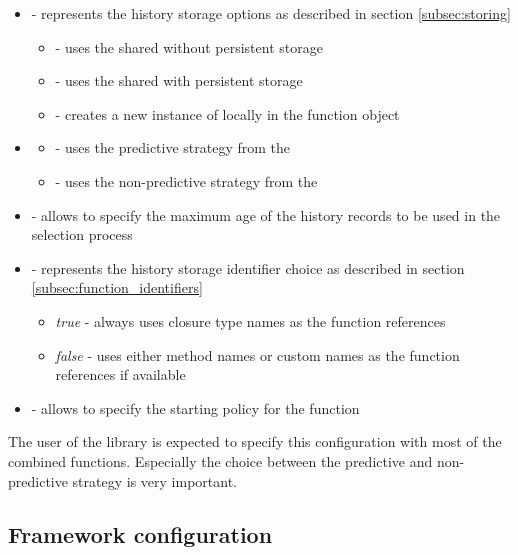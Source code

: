 \begin{itemize}
	\item {} - represents the history storage options as described in section \ref{subsec:storing}
	\begin{itemize}
		\item {} - uses the shared  without persistent storage
		\item {} - uses the shared  with persistent storage
		\item {} - creates a new instance of  locally in the function object
	\end{itemize}
\item {}
\begin{itemize}
	\item {} - uses the predictive strategy from the 
	\item {} - uses the non-predictive strategy from the 
\end{itemize}
\item {} - allows to specify the maximum age of the history records to be used in the selection process
\item {} - represents the history storage identifier choice as described in section \ref{subsec:function_identifiers}
\begin{itemize}
	\item \textit{true} - always uses closure type names as the function references
	\item \textit{false} - uses either method names or custom names as the function references if available
\end{itemize}
\item {} - allows to specify the starting policy for the function
\end{itemize}

The user of the library is expected to specify this configuration with most of the combined functions. Especially the choice between the predictive and non-predictive strategy is very important.

\subsection{Framework configuration}
\label{subsec:framework_config}

